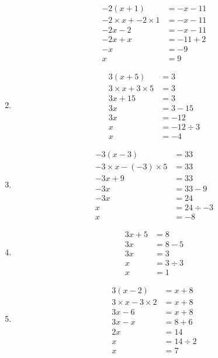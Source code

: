 \documentclass[11pt]{article}
\begin{document}
\begin{multicols}{3}
\begin{enumerate}
\begin{align*}
       -2(x+1) &= -x - 11 \\
       -2 \times x + -2 \times 1 &= -x - 11 \\
       -2x - 2 &= -x - 11 \\
       -2x + x &= -11 + 2 \\
       -x &= -9 \\
       x &= 9  
    \end{align*}
    \item
    \begin{align*}
       3(x + 5) &= 3 \\
       3 \times x + 3 \times 5 &= 3 \\
       3x + 15 &= 3 \\
       3x &= 3 - 15 \\
       3x &= -12 \\
       x &= -12 \div 3\\
       x &= -4  
    \end{align*}
    \item
    \begin{align*}
       -3(x - 3) &= 33 \\
       -3 \times x - (-3) \times 5 &= 33 \\
       -3x + 9 &= 33 \\
       -3x &= 33 - 9 \\
       -3x &= 24 \\
       x &= 24 \div -3\\
       x &= -8  
    \end{align*}
    \item
    \begin{align*}
        3x + 5 &= 8 \\
        3x &= 8 - 5 \\
        3x &= 3 \\
        x &= 3 \div 3 \\
        x &= 1
    \end{align*}
    \item
    \begin{align*}
       3(x - 2) &= x + 8 \\
       3 \times x - 3 \times 2 &= x + 8 \\
       3x - 6 &= x + 8 \\
       3x - x &= 8 + 6 \\
       2x &= 14 \\
       x &= 14 \div 2\\
       x &= 7  
    \end{align*}

\end{enumerate}
\end{multicols}
\end{document}
